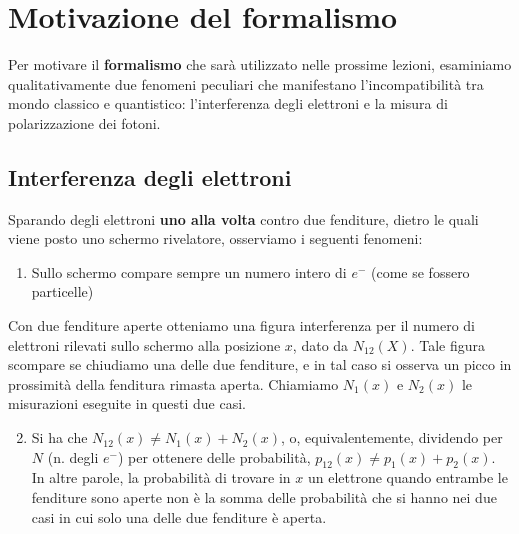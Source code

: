 \documentclass[FisicaTeorica.tex]{subfiles}
\begin{document}
\chapter{Motivazione del formalismo}
Per motivare il \textbf{formalismo} che sarà utilizzato nelle prossime lezioni, esaminiamo qualitativamente due fenomeni peculiari che manifestano l'incompatibilità tra mondo classico e quantistico: l'interferenza degli elettroni e la misura di polarizzazione dei fotoni.

\section{Interferenza degli elettroni}
Sparando degli elettroni \textbf{uno alla volta} contro due fenditure, dietro le quali viene posto uno schermo rivelatore, osserviamo i seguenti fenomeni:
\begin{enumerate}[I]
    \item Sullo schermo  compare sempre un numero intero di $e^-$ (come se fossero particelle)
\end{enumerate}
Con due fenditure aperte otteniamo una figura interferenza per il numero di elettroni rilevati sullo schermo alla posizione $x$, dato da $N_{12}(X)$. Tale figura scompare se chiudiamo una delle due fenditure, e in tal caso si osserva un picco in prossimità della fenditura rimasta aperta. Chiamiamo $N_1(x)$ e $N_2(x)$ le misurazioni eseguite in questi due casi.\\
\begin{enumerate}[I]
\setcounter{enumi}{1}
    \item Si ha che  $N_{12}(x) \neq N_1(x) + N_2(x)$, o, equivalentemente, dividendo per $N$ (n. degli $e^-$) per ottenere delle probabilità, $p_{12}(x) \neq p_1(x) + p_2(x)$. In altre parole, la probabilità di trovare in $x$ un elettrone quando entrambe le fenditure sono aperte non è la somma delle probabilità che si hanno nei due casi in cui solo una delle due fenditure è aperta.
\end{enumerate}
\end{document}
